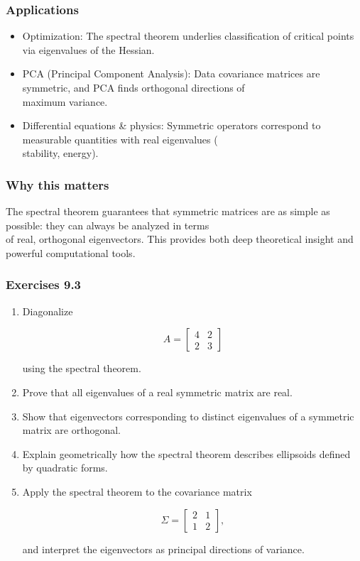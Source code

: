 \documentclass[
  12pt,
  a4paper,
]{article}
\begin{document}
\subsubsection{Applications}\label{applications-2}

\begin{itemize}
\item
  Optimization: The spectral theorem underlies classification of
  critical points via eigenvalues of the Hessian.
\item
  PCA (Principal Component Analysis): Data covariance matrices are
  symmetric, and PCA finds orthogonal directions of\\
  maximum variance.
\item
  Differential equations \& physics: Symmetric operators correspond to
  measurable quantities with real eigenvalues (\\
  stability, energy).
\end{itemize}

\subsubsection{Why this matters}\label{why-this-matters-34}

The spectral theorem guarantees that symmetric matrices are as simple as
possible: they can always be analyzed in terms\\
of real, orthogonal eigenvectors. This provides both deep theoretical
insight and powerful computational tools.

\subsubsection{Exercises 9.3}\label{exercises-93}

\begin{enumerate}
\def\labelenumi{\arabic{enumi}.}
\item
  Diagonalize

  \[A = \begin{bmatrix} 4 & 2 \\ 2 & 3 \end{bmatrix}\]

  using the spectral theorem.
\item
  Prove that all eigenvalues of a real symmetric matrix are real.
\item
  Show that eigenvectors corresponding to distinct eigenvalues of a
  symmetric matrix are orthogonal.
\item
  Explain geometrically how the spectral theorem describes ellipsoids
  defined by quadratic forms.
\item
  Apply the spectral theorem to the covariance matrix

  \[\Sigma = \begin{bmatrix} 2 & 1 \\ 1 & 2 \end{bmatrix},\]

  and interpret the eigenvectors as principal directions of variance.
\end{enumerate}
\end{document}
